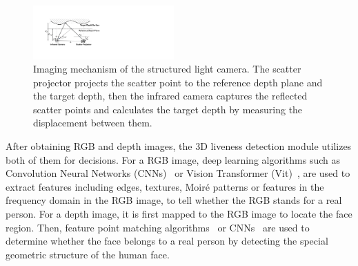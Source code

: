 %


\begin{figure}[!t]
	\centering
	\includegraphics[width=0.48\textwidth]{figures/imaging_mechanism.pdf} 
	\vspace{-0.1in}
	\caption{Imaging mechanism of the structured light camera. The scatter projector projects the scatter point to the reference depth plane and the target depth, then the infrared camera captures the reflected scatter points and calculates the target depth by measuring the displacement between them. }
	\label{imaging_mechanism}
	\vspace{-0.15in}
\end{figure}

After obtaining RGB and depth images, the 3D liveness detection module utilizes both of them for decisions.
For a RGB image, deep learning algorithms such as Convolution Neural Networks (CNNs)~\cite{yang2014learn, chen2020face, luo2018face} or Vision Transformer (Vit)~\cite{george2020effectiveness}, are used to extract features including edges, textures, Moiré patterns or features in the frequency domain in the RGB image, to tell whether the RGB stands for a real person.
For a depth image, it is first mapped to the RGB image to locate the face region. Then, feature point matching algorithms~\cite{goswami2014rgb} or CNNs~\cite{george2021cross, te2020exploring} are used to determine whether the face belongs to a real person by detecting the special geometric structure of the human face. 

